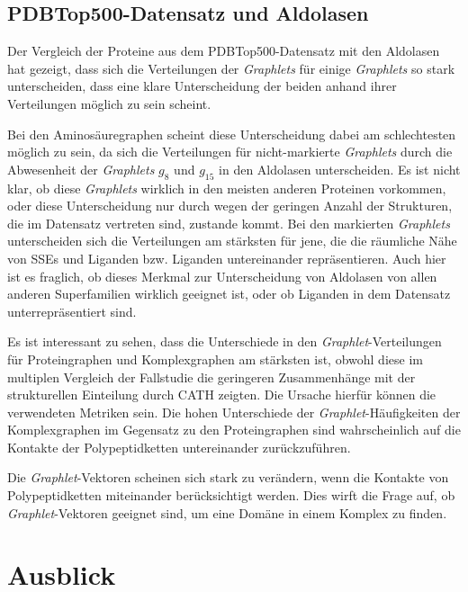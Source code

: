 \documentclass{report}
\begin{document}
\subsection{PDBTop500-Datensatz und Aldolasen}

Der Vergleich der Proteine aus dem PDBTop500-Datensatz mit den Aldolasen hat gezeigt, dass sich die Verteilungen der \textit{Graphlets} f\"ur einige \textit{Graphlets} so stark unterscheiden, dass eine klare Unterscheidung der beiden anhand ihrer Verteilungen m\"oglich zu sein scheint.

Bei den Aminos\"auregraphen scheint diese Unterscheidung dabei am schlechtesten m\"oglich zu sein, da sich die Verteilungen f\"ur nicht-markierte \textit{Graphlets} durch die Abwesenheit der \textit{Graphlets} $g_8$ und $g_{15}$ in den Aldolasen unterscheiden. Es ist nicht klar, ob diese \textit{Graphlets} wirklich in den meisten anderen Proteinen vorkommen, oder diese Unterscheidung nur durch wegen der geringen Anzahl der Strukturen, die im Datensatz vertreten sind, zustande kommt.
Bei den markierten \textit{Graphlets} unterscheiden sich die Verteilungen am st\"arksten f\"ur jene, die die r\"aumliche N\"ahe von SSEs und Liganden bzw. Liganden untereinander repr\"asentieren.
Auch hier ist es fraglich, ob dieses Merkmal zur Unterscheidung von Aldolasen von allen anderen Superfamilien wirklich geeignet ist, oder ob Liganden in dem Datensatz unterrepr\"asentiert sind. 

Es ist interessant zu sehen, dass die Unterschiede in den \textit{Graphlet}-Verteilungen f\"ur Proteingraphen und Komplexgraphen am st\"arksten ist, obwohl diese im multiplen Vergleich der Fallstudie die geringeren Zusammenh\"ange mit der strukturellen Einteilung durch CATH zeigten. Die Ursache hierf\"ur k\"onnen die verwendeten Metriken sein. Die hohen Unterschiede der \textit{Graphlet}-H\"aufigkeiten der Komplexgraphen im Gegensatz zu den Proteingraphen sind wahrscheinlich auf die Kontakte der Polypeptidketten untereinander zur\"uckzuf\"uhren.
 
Die \textit{Graphlet}-Vektoren scheinen sich stark zu ver\"andern, wenn die Kontakte von Polypeptidketten miteinander ber\"ucksichtigt werden. Dies wirft die Frage auf, ob \textit{Graphlet}-Vektoren geeignet sind, um eine Dom\"ane in einem Komplex zu finden.

\section{Ausblick}
\end{document}
